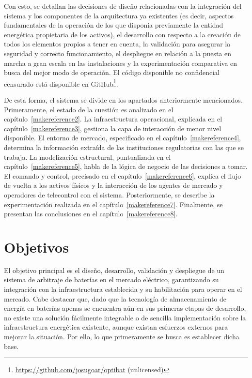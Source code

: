 Con esto, se detallan las decisiones de diseño relacionadas con la integración del sistema y los componentes de la arquitectura ya existentes (es decir, aspectos fundamentales de la operación de los que disponía previamente la entidad energética propietaria de los activos), el desarrollo con respecto a la creación de todos los elementos propios a tener en cuenta, la validación para asegurar la seguridad y correcto funcionamiento, el despliegue en relación a la puesta en marcha a gran escala en las instalaciones y la experimentación comparativa en busca del mejor modo de operación. El código disponible no confidencial censurado está disponible en GitHub\footnote{\url{https://github.com/josugoar/optibat} (unlicensed)}.

De esta forma, el sistema se divide en los apartados anteriormente mencionados. Primeramente, el estado de la cuestión es analizado en el capítulo~\ref{makereference2}. La infraestructura operacional, explicada en el capítulo~\ref{makereference3}, gestiona la capa de interacción de menor nivel disponible. El entorno de mercado, especificado en el capítulo~\ref{makereference4}, determina la información extraída de las instituciones regulatorias con las que se trabaja. La modelización estructural, puntualizada en el capítulo~\ref{makereference5}, habla de la lógica de negocio de las decisiones a tomar. El comando y control, precisado en el capítulo~\ref{makereference6}, explica el flujo de vuelta a los activos físicos y la interacción de los agentes de mercado y operadores de telecontrol con el sistema. Posteriormente, se describe la experimentación realizada en el capítulo~\ref{makereference7}. Finalmente, se presentan las conclusiones en el capítulo~\ref{makereference8}.

\section{Objetivos}%
\label{makereference1.1}

El objetivo principal es el diseño, desarrollo, validación y despliegue de un sistema de arbitraje de baterías en el mercado eléctrico, garantizando su integración con la infraestructura establecida y su habilitación para operar en el mercado. Cabe destacar que, dado que la tecnología de almacenamiento de energía en baterías apenas se encuentra aún en sus primeras etapas de desarrollo, no existe una solución fácilmente integrable o de sencilla implementación sobre la infraestructura energética existente, aunque existan esfuerzos externos para mejorar la situación. Por ello, lo que primeramente se busca es establecer dicha base.

